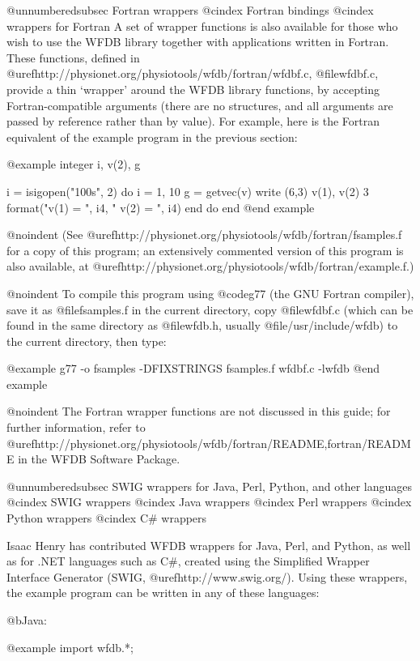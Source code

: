 {@unnumberedsubsec Fortran wrappers
@cindex Fortran bindings
@cindex wrappers for Fortran
A set of wrapper functions is also available for those who wish to use the WFDB
library together with applications written in Fortran.  These functions,
defined in @uref{http://physionet.org/physiotools/wfdb/fortran/wfdbf.c,
@file{wfdbf.c}}, provide a thin `wrapper' around the WFDB library functions, by
accepting Fortran-compatible arguments (there are no structures, and all
arguments are passed by reference rather than by value).  For example, here is
the Fortran equivalent of the example program in the previous section:

@example
        integer i, v(2), g

        i = isigopen("100s", 2)
        do i = 1, 10
         g = getvec(v)
         write (6,3) v(1), v(2)
 3      format("v(1) = ", i4, "    v(2) = ", i4)
        end do
        end
@end example

@noindent
(See @uref{http://physionet.org/physiotools/wfdb/fortran/fsamples.f}
for a copy of this program;  an extensively commented version of this program
is also available, at
@uref{http://physionet.org/physiotools/wfdb/fortran/example.f}.)

@noindent
To compile this program using @code{g77} (the GNU Fortran compiler), save it as
@file{fsamples.f} in the current directory, copy @file{wfdbf.c} (which can be
found in the same directory as @file{wfdb.h}, usually @file{/usr/include/wfdb})
to the current directory, then type:

@example
g77 -o fsamples -DFIXSTRINGS fsamples.f wfdbf.c -lwfdb
@end example

@noindent
The Fortran wrapper functions are not discussed in this guide; for further
information, refer to
@uref{http://physionet.org/physiotools/wfdb/fortran/README,fortran/README}
in the WFDB Software Package.

@unnumberedsubsec SWIG wrappers for Java, Perl, Python, and other languages
@cindex SWIG wrappers
@cindex Java wrappers
@cindex Perl wrappers
@cindex Python wrappers
@cindex C# wrappers

Isaac Henry has contributed WFDB wrappers for Java, Perl, and Python,
as well as for .NET languages such as C#, created using the Simplified
Wrapper Interface Generator (SWIG, @uref{http://www.swig.org/}).  Using
these wrappers, the example program can be written in any of these languages:

@b{Java:}

@example
import wfdb.*;

}
